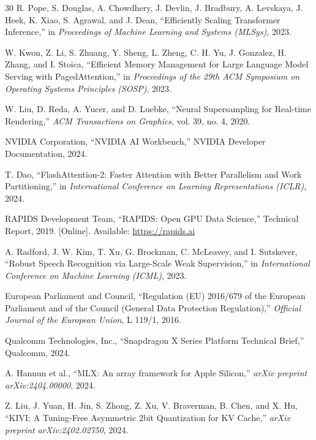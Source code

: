 \documentclass[conference]{IEEEtran}
\begin{document}
\begin{thebibliography}{30}
R. Pope, S. Douglas, A. Chowdhery, J. Devlin, J. Bradbury, A. Levskaya, J. Heek, K. Xiao, S. Agrawal, and J. Dean,
``Efficiently Scaling Transformer Inference,''
in \textit{Proceedings of Machine Learning and Systems (MLSys)}, 2023.

W. Kwon, Z. Li, S. Zhuang, Y. Sheng, L. Zheng, C. H. Yu, J. Gonzalez, H. Zhang, and I. Stoica,
``Efficient Memory Management for Large Language Model Serving with PagedAttention,''
in \textit{Proceedings of the 29th ACM Symposium on Operating Systems Principles (SOSP)}, 2023.

W. Liu, D. Reda, A. Yucer, and D. Luebke,
``Neural Supersampling for Real-time Rendering,''
\textit{ACM Transactions on Graphics}, vol. 39, no. 4, 2020.

NVIDIA Corporation,
``NVIDIA AI Workbench,''
NVIDIA Developer Documentation, 2024.

T. Dao,
``FlashAttention-2: Faster Attention with Better Parallelism and Work Partitioning,''
in \textit{International Conference on Learning Representations (ICLR)}, 2024.

RAPIDS Development Team,
``RAPIDS: Open GPU Data Science,''
Technical Report, 2019. [Online]. Available: \url{https://rapids.ai}

A. Radford, J. W. Kim, T. Xu, G. Brockman, C. McLeavey, and I. Sutskever,
``Robust Speech Recognition via Large-Scale Weak Supervision,''
in \textit{International Conference on Machine Learning (ICML)}, 2023.

European Parliament and Council,
``Regulation (EU) 2016/679 of the European Parliament and of the Council (General Data Protection Regulation),''
\textit{Official Journal of the European Union}, L 119/1, 2016.

Qualcomm Technologies, Inc.,
``Snapdragon X Series Platform Technical Brief,''
Qualcomm, 2024.

A. Hannun et al.,
``MLX: An array framework for Apple Silicon,''
\textit{arXiv preprint arXiv:2404.00000}, 2024.

Z. Liu, J. Yuan, H. Jin, S. Zhong, Z. Xu, V. Braverman, B. Chen, and X. Hu,
``KIVI: A Tuning-Free Asymmetric 2bit Quantization for KV Cache,''
\textit{arXiv preprint arXiv:2402.02750}, 2024.

\end{thebibliography}
\end{document}
